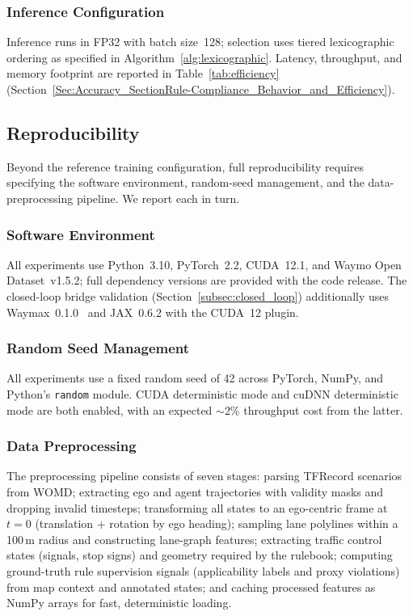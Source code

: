 \subsubsection{Inference Configuration}

Inference runs in FP32 with batch size~128; selection uses tiered lexicographic ordering as specified in Algorithm~\ref{alg:lexicographic}. Latency, throughput, and memory footprint are reported in Table~\ref{tab:efficiency} (Section~\ref{Sec:Accuracy_SectionRule-Compliance_Behavior_and_Efficiency}).

\subsection{Reproducibility}
\label{subsec:reproducibility}

Beyond the reference training configuration, full reproducibility requires specifying the software environment, random-seed management, and the data-preprocessing pipeline.  We report each in turn.

\subsubsection{Software Environment}

All experiments use Python~3.10, PyTorch~2.2, CUDA~12.1, and Waymo Open Dataset~v1.5.2; full dependency versions are provided with the code release. The closed-loop bridge validation (Section~\ref{subsec:closed_loop}) additionally uses Waymax~0.1.0~\cite{gulino2024waymax} and JAX~0.6.2 with the CUDA~12 plugin.

\subsubsection{Random Seed Management}

All experiments use a fixed random seed of 42 across PyTorch, NumPy, and Python's \texttt{random} module.  CUDA deterministic mode and cuDNN deterministic mode are both enabled, with an expected $\sim$2\% throughput cost from the latter.

\subsubsection{Data Preprocessing}

The preprocessing pipeline consists of seven stages: parsing TFRecord scenarios from WOMD; extracting ego and agent trajectories with validity masks and dropping invalid timesteps; transforming all states to an ego-centric frame at $t{=}0$ (translation + rotation by ego heading); sampling lane polylines within a 100\,m radius and constructing lane-graph features; extracting traffic control states (signals, stop signs) and geometry required by the rulebook; computing ground-truth rule supervision signals (applicability labels and proxy violations) from map context and annotated states; and caching processed features as NumPy arrays for fast, deterministic loading.

